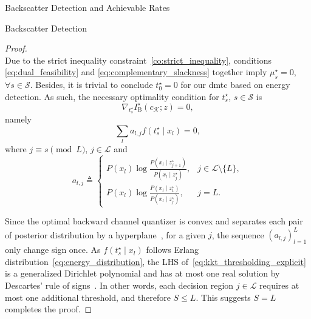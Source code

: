 \documentclass[journal]{IEEEtran}
\begin{document}
\begin{section}{Backscatter Detection and Achievable Rates}
\begin{subsection}{Backscatter Detection}
\begin{proof}
\begin{subequations}
				\end{subequations}
				Due to the strict inequality constraint~\eqref{co:strict_inequality}, conditions \eqref{eq:dual_feasibility} and \eqref{eq:complementary_slackness} together imply $\mu_s^\star = 0$, $\forall s \in \mathcal{S}$. Besides, it is trivial to conclude $t_0^\star = 0$ for our \gls{dmtc} based on energy detection. As such, the necessary optimality condition for $t_s^\star$, $s \in \mathcal{S}$ is
				\begin{equation}
					\nabla_{t_{s}^\star} I^\star_{\mathrm{B}}(c_{\mathcal{K}};z) = 0,
				\end{equation}
				namely
				\begin{equation}
					\sum_l a_{l,j} f(t_{s}^\star \mid x_l) = 0,
					\label{eq:kkt_thresholding_explicit}
				\end{equation}
				where $j \equiv s \pmod L$, $j \in \mathcal{L}$ and
				\begin{equation}
					a_{l,j} \triangleq
					\begin{cases}
						P(x_l) \log \frac{P(x_l \mid z_{j+1}^\star)}{P(x_l \mid z_j^\star)}, & j \in \mathcal{L} \setminus \{L\},\\
						P(x_l) \log \frac{P(x_l \mid z_{1}^\star)}{P(x_l \mid z_j^\star)}, & j = L.
					\end{cases}
				\end{equation}

				Since the optimal backward channel quantizer is convex and separates each pair of posterior distribution by a hyperplane~\cite{Nguyen2020a}, for a given $j$, the sequence $(a_{l,j})_{l=1}^{L}$ only change sign once. As $f(t_{s}^\star \mid x_l)$ follows Erlang distribution~\eqref{eq:energy_distribution}, the LHS of~\eqref{eq:kkt_thresholding_explicit} is a generalized Dirichlet polynomial and has at most one real solution by Descartes' rule of signs~\cite{Jameson2006}. In other words, each decision region $j \in \mathcal{L}$ requires at most one additional threshold, and therefore $S \le L$. This suggests $S = L$ completes the proof.




\end{proof}
\end{subsection}
\end{section}
\end{document}
